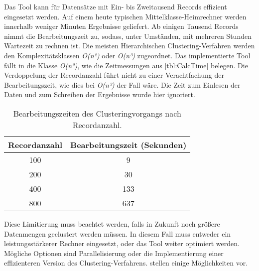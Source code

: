 Das Tool kann für Datensätze mit Ein- bis Zweitausend Records effizient eingesetzt werden.
Auf einem heute typischen Mittelklasse-Heimrechner werden innerhalb weniger Minuten Ergebnisse geliefert.
Ab einigen Tausend Records nimmt die Bearbeitungszeit zu,
sodass, unter Umständen, mit mehreren Stunden Wartezeit zu rechnen ist.
Die meisten Hierarchischen Clustering-Verfahren werden den Komplexitätsklassen
\emph{O(n²)} oder \emph{O(n³)} zugeordnet.
Das implementierte Tool fällt in die Klasse \emph{O(n²)},
wie die Zeitmessungen aus \autoref{tbl:CalcTime} belegen.
Die Verdoppelung der Recordanzahl führt nicht zu einer Verachtfachung der Bearbeitungszeit,
wie dies bei \emph{O(n³)} der Fall wäre.
Die Zeit zum Einlesen der Daten
und zum Schreiben der Ergebnisse wurde hier ignoriert.
\begin{table}[ht]
  \begin{center}
  \begin{tabular}{ |c|c| } 
   \hline
   Recordanzahl & Bearbeitungszeit (Sekunden) \\
   \hline \hline
   100 & 9 \\
   \hline
   200 & 30 \\
   \hline
   400 & 133 \\
   \hline
   800 & 637 \\
   \hline
  \end{tabular}
  \caption{Bearbeitungszeiten des Clusteringvorgangs nach Recordanzahl.}
  \label{tbl:CalcTime}
  \end{center}
\end{table}
Diese Limitierung muss beachtet werden,
falls in Zukunft noch größere Datenmengen geclustert werden müssen.
In diesem Fall muss entweder ein leistungsstärkerer Rechner eingesetzt,
oder das Tool weiter optimiert werden.
Mögliche Optionen sind Parallelisierung
oder die Implementierung einer effizienteren Version des Clustering-Verfahrens.
\citet{patel_study_2015} stellen einige Möglichkeiten vor.

